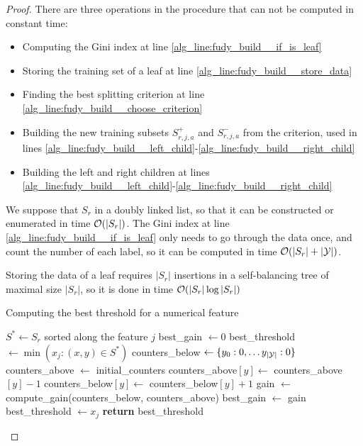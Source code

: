 \begin{proof}
    There are three operations in the procedure that can not be computed in constant time:
    \begin{itemize}
        \item Computing the Gini index at line \ref{alg_line:fudy_build__if_is_leaf}
        \item Storing the training set of a leaf at line \ref{alg_line:fudy_build__store_data}
        \item Finding the best splitting criterion at line \ref{alg_line:fudy_build__choose_criterion}
        \item Building the new training subsets $S^+_{r,j,a}$ and $S^-_{r,j,a}$ from the criterion, used in lines \ref{alg_line:fudy_build__left_child}-\ref{alg_line:fudy_build__right_child}
        \item Building the left and right children at lines \ref{alg_line:fudy_build__left_child}-\ref{alg_line:fudy_build__right_child}
    \end{itemize}
    We suppose that $S_r$ in a doubly linked list, so that it can be constructed or enumerated in time $\mathcal{O}(|S_r|)$. The Gini index at line \ref{alg_line:fudy_build__if_is_leaf} only needs to go through the data once, and count the number of each label, so it can be computed in time $\mathcal{O}(|S_r| + |\mathcal{Y}|)$.

    Storing the data of a leaf requires $|S_r|$ insertions in a self-balancing tree of maximal size $|S_r|$, so it is done in time $\mathcal{O}(|S_r|\log |S_r|)$

    \begin{algorithm}
    \caption{Computing the best threshold for a numerical feature} \label{alg:best_gain_numerical}
    \begin{algorithmic}[1]
    \State $S^* \gets S_r$ sorted along the feature $j$\label{alg_line:best_gain_num__sort}
    \State best\_gain $\gets 0$
    \State best\_threshold $\gets \min(x_j: (x, y) \in S^*)$\label{alg_line:best_gain_num__min_thr}
    \State counters\_below $\gets \{y_0:0, \dots y_{|\mathcal{Y}|}:0\}$\label{alg_line:best_gain_num__init_counter_b}
    \State counters\_above $\gets$ initial\_counters\label{alg_line:best_gain_num__init_counter_a}
        \State counters\_above$[y] \gets$ counters\_above$[y] - 1$
        \State counters\_below$[y] \gets$ counters\_below$[y] + 1$
        \label{alg_line:best_gain_num__if_different_values}
            \State gain $\gets$ compute\_gain(counters\_below, counters\_above)\label{alg_line:best_gain_num__compute_gain}
                \State best\_gain $\gets$ gain
                \State best\_threshold $\gets x_j$
            \EndIf
        \EndIf
    \EndFor
    \State \textbf{return} best\_threshold
    \EndProcedure
    \end{algorithmic}
    \end{algorithm}


\end{proof}
